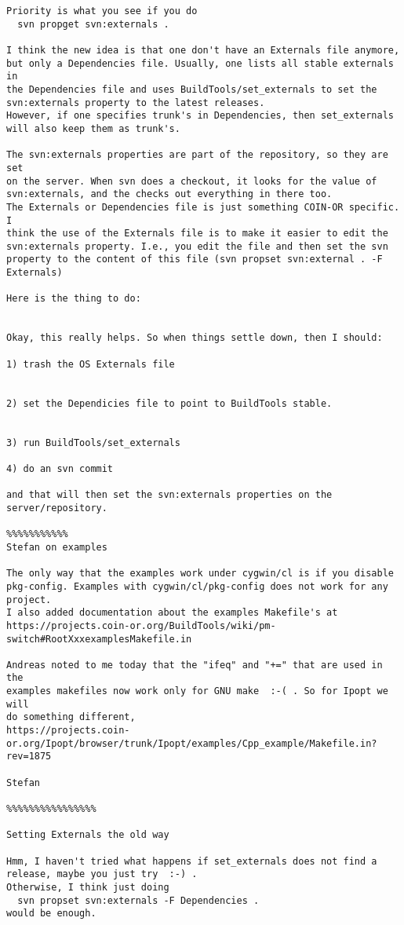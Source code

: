 \begin{verbatim}
Priority is what you see if you do
  svn propget svn:externals .

I think the new idea is that one don't have an Externals file anymore,
but only a Dependencies file. Usually, one lists all stable externals in
the Dependencies file and uses BuildTools/set_externals to set the
svn:externals property to the latest releases.
However, if one specifies trunk's in Dependencies, then set_externals
will also keep them as trunk's.

The svn:externals properties are part of the repository, so they are set
on the server. When svn does a checkout, it looks for the value of
svn:externals, and the checks out everything in there too.
The Externals or Dependencies file is just something COIN-OR specific. I
think the use of the Externals file is to make it easier to edit the
svn:externals property. I.e., you edit the file and then set the svn
property to the content of this file (svn propset svn:external . -F
Externals)

Here is the thing to do:


Okay, this really helps. So when things settle down, then I should:

1) trash the OS Externals file


2) set the Dependicies file to point to BuildTools stable.


3) run BuildTools/set_externals

4) do an svn commit

and that will then set the svn:externals properties on the server/repository. 

%%%%%%%%%%%
Stefan on examples

The only way that the examples work under cygwin/cl is if you disable
pkg-config. Examples with cygwin/cl/pkg-config does not work for any
project.
I also added documentation about the examples Makefile's at
https://projects.coin-or.org/BuildTools/wiki/pm-switch#RootXxxexamplesMakefile.in

Andreas noted to me today that the "ifeq" and "+=" that are used in the
examples makefiles now work only for GNU make  :-( . So for Ipopt we will
do something different,
https://projects.coin-or.org/Ipopt/browser/trunk/Ipopt/examples/Cpp_example/Makefile.in?rev=1875

Stefan

%%%%%%%%%%%%%%%%

Setting Externals the old way

Hmm, I haven't tried what happens if set_externals does not find a
release, maybe you just try  :-) .
Otherwise, I think just doing
  svn propset svn:externals -F Dependencies .
would be enough.




\end{verbatim}
